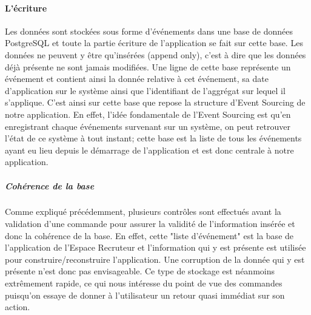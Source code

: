 \paragraph{L'écriture}
\label{par:L'écriture}
Les données sont stockées sous forme d'événements dans une base de données PostgreSQL et toute la partie écriture de l'application se fait sur cette base.
Les données ne peuvent y être qu'insérées (append only), c'est à dire que les données déjà présente ne sont jamais modifiées.
Une ligne de cette base représente un événement et contient ainsi la donnée relative à cet événement, sa date d'application sur le système ainsi que l'identifiant de l'aggrégat sur lequel il s'applique.
C'est ainsi sur cette base que repose la structure d'Event Sourcing de notre application.
En effet, l'idée fondamentale de l'Event Sourcing est qu'en enregistrant chaque événements survenant sur un système, on peut retrouver l'état de ce système à tout instant; cette base est la liste de tous les événements ayant eu lieu depuis le démarrage de l'application et est donc centrale à notre application.
\subparagraph{Cohérence de la base}
Comme expliqué précédemment, plusieurs contrôles sont effectués avant la validation d'une commande pour assurer la validité de l'information insérée et donc la cohérence de la base.
En effet, cette "liste d'événement" est la base de l'application de l'Espace Recruteur et l'information qui y est présente est utilisée pour construire/reconstruire l'application.
Une corruption de la donnée qui y est présente n'est donc pas envisageable.
Ce type de stockage est néanmoins extrêmement rapide, ce qui nous intéresse du point de vue des commandes puisqu'on essaye de donner à l'utilisateur un retour quasi immédiat sur son action.

